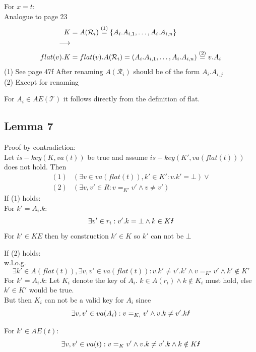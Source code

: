 \begin{solutionbox}
  For $x=t$:\\
  Analogue to page 23
  \begin{align*}
    K & = A(\mathcal{R}_i) \stackrel{\text{(1)}}{=} \left\{ A_i.A_{i,1},\ldots,A_i.A_{i,n} \right\} \\
    \longrightarrow  \\
    flat(v).K & = flat(v).A(\mathcal{R}_i) = (A_i.A_{i,1},\ldots,A_i.A_{i,n}) \stackrel{\text{(2)}}{=} v.A_i
  \end{align*}
  (1) See page 47f After renaming $A(\mathcal{R}_i)$ should be of the form $A_i.A_{i,j}$\\
  (2) Except for renaming

  For $A_i \in AE(\mathcal{T})$ it follows directly from the definition of flat.

  \subsection{Lemma 7}
  Proof by contradiction: \\
  Let $is-key(K,va(t))$ be true and assume $is-key(K',va(flat(t)))$ does not hold. Then
  \begin{align*}
    (1) & \left(\exists v \in va(flat(t)),k' \in K' : v.k' = \bot\right) \vee \\
    (2) & \left( \exists v,v' \in R : v =_{K'} v' \wedge v \neq v' \right)
  \end{align*}
  If (1) holds: \\
  For $k' = A_i.k$:
  \[
    \exists v' \in r_i : v'.k = \bot \wedge k \in K \text{\Lightning}
  \]
  For $k' \in KE$ then by construction $k' \in K$ so $k'$ can not be $\bot$\Lightning

  If (2) holds: \\
  w.l.o.g. \[
    \exists k' \in A(flat(t)), \exists v,v' \in va(flat(t)): v.k' \neq v'.k' \wedge v =_{K'} v' \wedge k' \notin K'  
  \]
For $k' = A_i.k$: Let $K_i$ denote the key of $A_i$. $k \in A(r_i) \wedge k \notin K_i$ must hold, else $k' \in K'$ would be true.\\
But then $K_i$ can not be a valid key for $A_i$ since
\[
  \exists v,v' \in va(A_i) : v =_{K_i} v' \wedge v.k \neq v'.k \text{\Lightning}
\]

For $k' \in AE(t)$:
\[
  \exists v,v' \in va(t) : v =_K v' \wedge v.k \neq v'.k \wedge k \notin K \text{\Lightning}
\]
\end{solutionbox}

